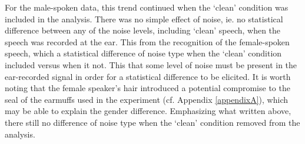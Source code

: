For the male-spoken data, this trend continued when the `clean' condition was included in the analysis.  There was no simple effect of noise, ie. no statistical difference between any of the noise levels, including `clean' speech, when the speech was recorded at the ear.  This \DIFdelbegin {}\DIFdelend \DIFaddbegin {}\DIFaddend from the recognition of the female-spoken speech, which \DIFdelbegin {}\DIFdelend \DIFaddbegin {}\DIFaddend a statistical difference of noise type when the `clean' condition \DIFdelbegin {}\DIFdelend \DIFaddbegin {}\DIFaddend included versus when it \DIFdelbegin {}\DIFdelend \DIFaddbegin {}\DIFaddend not.  This \DIFdelbegin {}\DIFdelend \DIFaddbegin {}\DIFaddend that some level of noise must be present in the ear-recorded signal in order for a statistical difference to be elicited.  It is worth noting that the female speaker's hair introduced a potential compromise to the seal of the earmuffs used in the experiment (cf. Appendix \ref{appendixA}), which may be able to explain the gender difference. Emphasizing what \DIFdelbegin {}\DIFdelend \DIFaddbegin {}\DIFaddend written above, there \DIFdelbegin {}\DIFdelend \DIFaddbegin {}\DIFaddend still no difference of noise type when the `clean' condition \DIFdelbegin {}\DIFdelend \DIFaddbegin {}\DIFaddend removed from the analysis.  \DIFaddbegin {}\DIFaddend 

